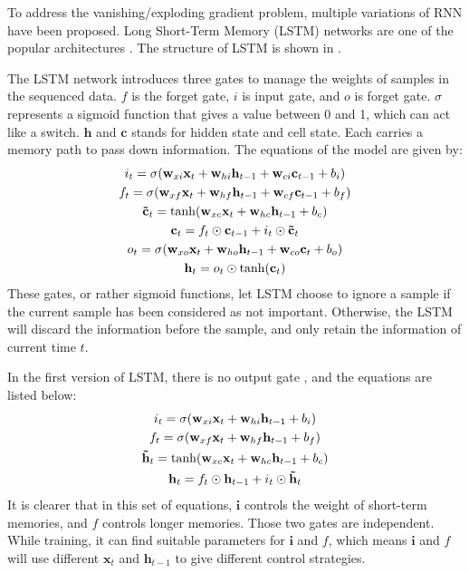 To address the vanishing/exploding gradient problem, multiple variations of RNN have been proposed. 
Long Short-Term Memory (LSTM) networks are one of the popular architectures \cite{lstm}. 
The structure of LSTM is shown in . 

The LSTM network introduces three gates to manage the weights of samples in the sequenced data. $f$ is the forget gate, $i$ is input gate, and $o$ is forget gate. 
$\sigma$ represents a sigmoid function that gives a value between 0 and 1, which can act like a switch. 
$\mathbf{h}$ and $\mathbf{c}$ stands for hidden state and cell state. Each carries a memory path to pass down information.  
The equations of the model are given by: 
\begin{gather}
    i_t = \sigma (\mathbf{w}_{xi} \mathbf{x}_t + \mathbf{w}_{hi} \mathbf{h}_{t-1} + \mathbf{w}_{ci} \mathbf{c}_{t-1} + b_i) \notag\\
    f_t = \sigma (\mathbf{w}_{xf} \mathbf{x}_t + \mathbf{w}_{hf} \mathbf{h}_{t-1} + \mathbf{w}_{cf} \mathbf{c}_{t-1} + b_f) \notag\\
    \mathbf{\tilde{c}}_t = \tanh (\mathbf{w}_{xc} \mathbf{x}_t + \mathbf{w}_{hc} \mathbf{h}_{t-1} + b_c) \\
    \mathbf{c}_t = f_t \odot \mathbf{c}_{t-1} + i_t \odot \mathbf{\tilde{c}}_t \notag\\
    o_t = \sigma (\mathbf{w}_{xo} \mathbf{x}_t + \mathbf{w}_{ho} \mathbf{h}_{t-1} + \mathbf{w}_{co} \mathbf{c}_t + b_o) \notag\\
    \mathbf{h}_t = o_t \odot \tanh (\mathbf{c}_t) \notag
\end{gather}
These gates, or rather sigmoid functions, let LSTM choose to ignore a sample if the current sample has been considered as not important. 
Otherwise, the LSTM will discard the information before the sample, and only retain the information of current time $t$. 

In the first version of LSTM, there is no output gate \cite{ribeiro2020exploding}, and the equations are listed below: 
\begin{gather}
    i_t = \sigma (\mathbf{w}_{xi} \mathbf{x}_t + \mathbf{w}_{hi} \mathbf{h}_{t-1} + b_i) \notag\\
    f_t = \sigma (\mathbf{w}_{xf} \mathbf{x}_t + \mathbf{w}_{hf} \mathbf{h}_{t-1} + b_f) \notag\\
    \mathbf{\tilde{h}}_t = \tanh (\mathbf{w}_{xc} \mathbf{x}_t + \mathbf{w}_{hc} \mathbf{h}_{t-1} + b_c) \\
    \mathbf{h}_t = f_t \odot \mathbf{h}_{t-1} + i_t \odot \mathbf{\tilde{h}}_t \notag
\end{gather}
It is clearer that in this set of equations, $\mathbf{i}$ controls the weight of short-term memories, and $f$ controls longer memories. 
Those two gates are independent. While training, it can find suitable parameters for $\mathbf{i}$ and $f$, 
which means $\mathbf{i}$ and $f$  will use different $\mathbf{x} _t$ and $\mathbf{h} _{t-1}$ to give different control strategies.

